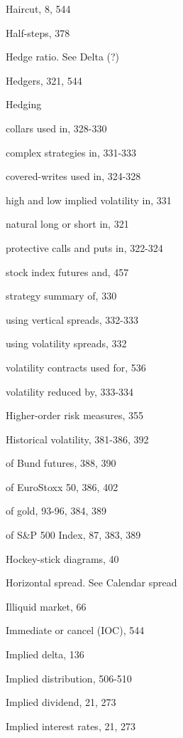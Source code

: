 \noindent Haircut, 8, 544\par
\noindent Half-steps, 378\par
Hedge ratio. See Delta (?)\par
\noindent Hedgers, 321, 544\par
\noindent Hedging\par
\noindent collars used in, 328-330\par
\noindent complex strategies in, 331-333\par
\noindent covered-writes used in, 324-328\par
\noindent high and low implied volatility in, 331\par
\noindent natural long or short in, 321\par
\noindent protective calls and puts in, 322-324\par
\noindent stock index futures and, 457\par
\noindent strategy summary of, 330\par
\noindent using vertical spreads, 332-333\par
\noindent using volatility spreads, 332\par
\noindent volatility contracts used for, 536\par
\noindent volatility reduced by, 333-334\par
\noindent Higher-order risk measures, 355\par
\noindent Historical volatility, 381-386, 392\par
\noindent of Bund futures, 388, 390\par
\noindent of EuroStoxx 50, 386, 402\par
\noindent of gold, 93-96, 384, 389\par
\noindent of S\&P 500 Index, 87, 383, 389\par
\noindent Hockey-stick diagrams, 40\par
\noindent Horizontal spread. See Calendar spread\par
\noindent Illiquid market, 66\par
\noindent Immediate or cancel (IOC), 544\par
\noindent Implied delta, 136\par
\noindent Implied distribution, 506-510\par
\noindent Implied dividend, 21, 273\par
\noindent Implied interest rates, 21, 273\par

